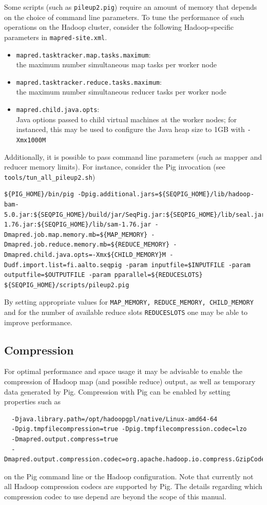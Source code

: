 Some scripts (such as {\tt pileup2.pig}) require an amount of memory that
depends on the choice of command line parameters. To tune the performance of
such operations on the Hadoop cluster,
consider the following Hadoop-specific parameters in {\tt mapred-site.xml}.
\begin{itemize}
\item {\tt mapred.tasktracker.map.tasks.maximum}: \\the maximum number simultaneous map tasks per worker node
\item {\tt mapred.tasktracker.reduce.tasks.maximum}:\\ the maximum number simultaneous reducer tasks per worker node
\item {\tt mapred.child.java.opts}:\\ Java options passed to child virtual
	machines at the worker nodes; for instanced, this may be used to configure
	the Java heap size to 1GB with {\tt -Xmx1000M}
\end{itemize}
Additionally, it is possible to pass command line parameters (such as mapper and reducer memory limits).
For instance, consider the Pig invocation (see {\tt tools/tun\_all\_pileup2.sh})
\begin{lstlisting}
${PIG_HOME}/bin/pig -Dpig.additional.jars=${SEQPIG_HOME}/lib/hadoop-bam-5.0.jar:${SEQPIG_HOME}/build/jar/SeqPig.jar:${SEQPIG_HOME}/lib/seal.jar:${SEQPIG_HOME}/lib/picard-1.76.jar:${SEQPIG_HOME}/lib/sam-1.76.jar -Dmapred.job.map.memory.mb=${MAP_MEMORY} -Dmapred.job.reduce.memory.mb=${REDUCE_MEMORY} -Dmapred.child.java.opts=-Xmx${CHILD_MEMORY}M -Dudf.import.list=fi.aalto.seqpig -param inputfile=$INPUTFILE -param outputfile=$OUTPUTFILE -param pparallel=${REDUCESLOTS} ${SEQPIG_HOME}/scripts/pileup2.pig
\end{lstlisting}
By setting appropriate values for {\tt MAP\_MEMORY, REDUCE\_MEMORY,
CHILD\_MEMORY} and for the number of available reduce slots {\tt REDUCESLOTS}
one may be able to improve performance.

\subsection{Compression}

For optimal performance and space usage it may be advisable to enable the compression of
Hadoop map (and possible reduce) output, as well as temporary data generated
by Pig. Compression with Pig can be enabled by setting properties such as
\begin{lstlisting}
  -Djava.library.path=/opt/hadoopgpl/native/Linux-amd64-64
  -Dpig.tmpfilecompression=true -Dpig.tmpfilecompression.codec=lzo
  -Dmapred.output.compress=true
  -Dmapred.output.compression.codec=org.apache.hadoop.io.compress.GzipCodec
\end{lstlisting}
on the Pig command line or the Hadoop configuration. Note that currently not all
Hadoop compression codecs are supported by Pig.  The details regarding which
compression codec to use depend are beyond the scope of this manual.

